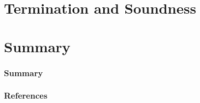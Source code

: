 \documentclass[]{beamer}
\begin{document}
\section{Termination and Soundness}
\frame{\tableofcontents[currentsection]}

\begin{frame}

\end{frame}

\section{Summary}
\frame{\tableofcontents[currentsection]}

\begin{frame}
  \frametitle{Summary}
\end{frame}

\begin{frame}
  \frametitle{References}
\end{frame}

\end{document}
